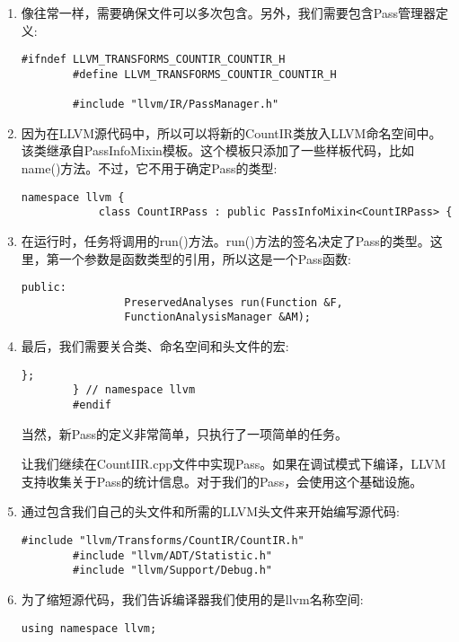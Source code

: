 \begin{enumerate}
	\item 像往常一样，需要确保文件可以多次包含。另外，我们需要包含Pass管理器定义:
	\begin{lstlisting}[caption={}]
		#ifndef LLVM_TRANSFORMS_COUNTIR_COUNTIR_H
		#define LLVM_TRANSFORMS_COUNTIR_COUNTIR_H
		
		#include "llvm/IR/PassManager.h"
	\end{lstlisting}
	
	\item 因为在LLVM源代码中，所以可以将新的CountIR类放入LLVM命名空间中。该类继承自PassInfoMixin模板。这个模板只添加了一些样板代码，比如name()方法。不过，它不用于确定Pass的类型:
	\begin{lstlisting}[caption={}]
		namespace llvm {
			class CountIRPass : public PassInfoMixin<CountIRPass> {
			\end{lstlisting}
			
			\item 在运行时，任务将调用的run()方法。run()方法的签名决定了Pass的类型。这里，第一个参数是函数类型的引用，所以这是一个Pass函数:
			\begin{lstlisting}[caption={}]
				public:
				PreservedAnalyses run(Function &F,
				FunctionAnalysisManager &AM);
			\end{lstlisting}
			
			\item 最后，我们需要关合类、命名空间和头文件的宏:
			\begin{lstlisting}[caption={}]
			};
		} // namespace llvm
		#endif
	\end{lstlisting}
	当然，新Pass的定义非常简单，只执行了一项简单的任务。\par
	
	让我们继续在CountIIR.cpp文件中实现Pass。如果在调试模式下编译，LLVM支持收集关于Pass的统计信息。对于我们的Pass，会使用这个基础设施。\par
	
	\item 通过包含我们自己的头文件和所需的LLVM头文件来开始编写源代码:
	\begin{lstlisting}[caption={}]
		#include "llvm/Transforms/CountIR/CountIR.h"
		#include "llvm/ADT/Statistic.h"
		#include "llvm/Support/Debug.h"
	\end{lstlisting}
	
	\item 为了缩短源代码，我们告诉编译器我们使用的是llvm名称空间:
	\begin{lstlisting}[caption={}]
		using namespace llvm;
	\end{lstlisting}
	

\end{enumerate}

